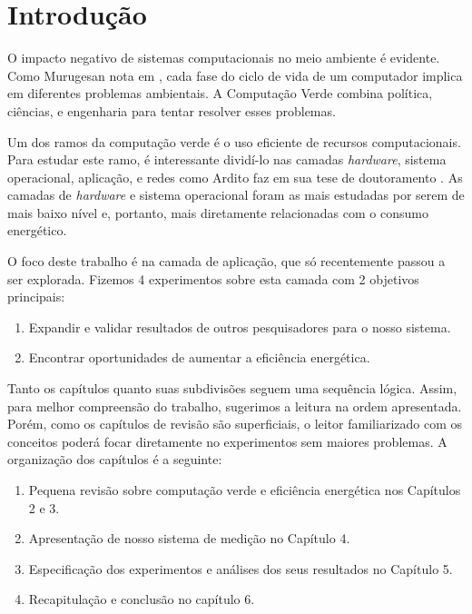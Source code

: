 \chapter{Introdução}
\label{cap:introducao}

O impacto negativo de sistemas computacionais no meio ambiente é evidente. Como Murugesan nota em \cite{murugesan2008harnessing}, cada fase do ciclo de vida de um computador implica em diferentes problemas ambientais. A Computação Verde combina política, ciências, e engenharia para tentar resolver esses problemas.

Um dos ramos da computação verde é o uso eficiente de recursos computacionais. Para estudar este ramo, é interessante dividí-lo nas camadas \emph{hardware}, sistema operacional, aplicação, e redes como Ardito faz em sua tese de doutoramento \cite{ardito2014energy}. As camadas de \emph{hardware} e sistema operacional foram as mais estudadas por serem de mais baixo nível e, portanto, mais diretamente relacionadas com o consumo energético.

\vspace{5mm}

O foco deste trabalho é na camada de aplicação, que só recentemente passou a ser explorada. Fizemos 4 experimentos sobre esta camada com 2 objetivos principais:
\begin{enumerate}
    \item Expandir e validar resultados de outros pesquisadores para o nosso sistema.
    \item Encontrar oportunidades de aumentar a eficiência energética.
\end{enumerate}

\vspace{5mm}
Tanto os capítulos quanto suas subdivisões seguem uma sequência lógica. Assim, para melhor compreensão do trabalho, sugerimos a leitura na ordem apresentada. Porém, como os capítulos de revisão são superficiais, o leitor familiarizado com os conceitos poderá focar diretamente no experimentos sem maiores problemas. A organização dos capítulos é a seguinte:
\begin{enumerate}
    \item Pequena revisão sobre computação verde e eficiência energética nos Capítulos 2 e 3.
    \item Apresentação de nosso sistema de medição no Capítulo 4.
    \item Especificação dos experimentos e análises dos seus resultados no Capítulo 5.
    \item Recapitulação e conclusão no capítulo 6.
\end{enumerate}


